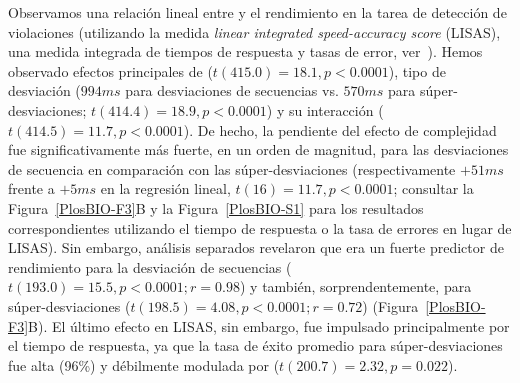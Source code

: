 
Observamos una relación lineal entre \mdlbin y el rendimiento en la tarea de detección de violaciones (utilizando la medida \textit{linear integrated speed-accuracy score} (LISAS), una medida integrada de tiempos de respuesta y tasas de error, ver~\cite{f87,f88}). Hemos observado efectos principales de \mdlbin ($t(415.0) = 18.1, p <0.0001$), tipo de desviación ($994ms$ para desviaciones de secuencias vs. $570ms$ para súper-desviaciones; $t (414.4) = 18.9, p < 0.0001$) y su interacción ($t(414.5) = 11.7, p < 0.0001$). De hecho, la pendiente del efecto de complejidad fue significativamente más fuerte, en un orden de magnitud, para las desviaciones de secuencia en comparación con las súper-desviaciones (respectivamente $+51ms$ frente a $+5ms$ en la regresión lineal, $t(16) = 11.7, p < 0.0001$; consultar la Figura~\ref{PlosBIO-F3}B y la Figura~\ref{PlosBIO-S1} para los resultados correspondientes utilizando el tiempo de respuesta o la tasa de errores en lugar de LISAS). Sin embargo, análisis separados revelaron que \mdlbin era un fuerte predictor de rendimiento para la desviación de secuencias ($t(193.0) = 15.5, p < 0.0001; r = 0.98$) y también, sorprendentemente, para súper-desviaciones ($t (198.5) = 4.08, p < 0.0001; r = 0.72$) (Figura~\ref{PlosBIO-F3}B). El último efecto en LISAS, sin embargo, fue impulsado principalmente por el tiempo de respuesta, ya que la tasa de éxito promedio para súper-desviaciones fue alta (96\%) y débilmente modulada por \mdlbin ($t(200.7) = 2.32, p = 0.022$).

